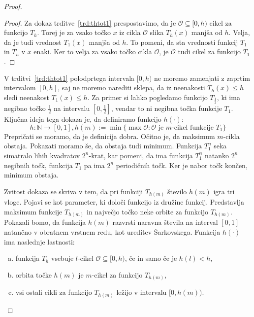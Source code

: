 \documentclass[mat2]{fmfdelo}
\newcommand{\N}{\mathbb N}
\begin{document}
\begin{proof}
\begin{proof}
Za dokaz trditve~\ref{trd:thtot1} prespostavimo, da je $\mathcal{O} \subseteq [0, h)$ cikel za funkcijo $T_h$. Torej je za vsako točko $x$ iz cikla $\mathcal{O}$ slika $T_h(x)$ manjša od $h$. Velja, da je tudi vrednost $T_1(x)$ manjša od $h$. To pomeni, da sta vrednosti funkcij $T_1$ in $T_h$ v $x$ enaki. Ker to velja za vsako točko cikla $\mathcal{O}$, je $\mathcal{O}$ tudi cikel za funkcijo $T_1$.
\end{proof}
V trditvi~\ref{trd:thtot1} polodprtega intervala $[0, h)$ ne moremo zamenjati z zaprtim intervalom $[0, h]$, saj ne moremo narediti sklepa, da iz neenakosti $T_h(x) \leq h$ sledi neenakost $T_1(x) \leq h$. Za primer si lahko pogledamo funkcijo $T_{\frac{1}{2}}$, ki ima negibno točko $\frac{1}{2}$ na intervalu $[0, \frac{1}{2}]$, vendar to ni negibna točka funkcije $T_1$.
Ključna ideja tega dokaza je, da definiramo funkcijo $h(\cdot)$:
$$h: \N \to [0, 1], h(m) := \min\{\max \mathcal{O}: \mathcal{O}\text{ je }m\text{-cikel funkcije }T_1 \}$$
Prepričati se moramo, da je definicija dobra. Očitno je, da maksimum $m$-cikla obstaja. Pokazati moramo še, da obstaja tudi minimum. Funkcija $T_1^n$ seka simatralo lihih kvadratov $2^n$-krat, kar pomeni, da ima funkcija $T_1^n$ natanko $2^n$ negibnih točk, funkcija $T_1$ pa ima $2^n$ periodičnih točk. Ker je nabor točk končen, minimum obstaja.

Zvitost dokaza se skriva v tem, da pri funkciji $T_{h(m)}$ število $h(m)$ igra tri vloge. Pojavi se kot parameter, ki določi funkcijo iz družine funkcij. Predstavlja maksimum funkcije $T_{h(m)}$ in največjo točko neke orbite za funkcijo $T_{h(m)}$. Pokazali bomo, da funkcija $h(m)$ razvrsti naravna števila na interval $[0, 1]$ natančno v obratnem vrstnem redu, kot ureditev Šarkovskega.
Funkcija $h(\cdot)$ ima naslednje lastnosti:
\begin{enumerate}[(a)]
\item funkcija $T_h$  vsebuje $l$-cikel $\mathcal{O}\subseteq [0, h)$, če in samo če je $h(l)<h$,\label{l1}
\item orbita točke $h(m)$ je $m$-cikel za funkcijo $T_{h(m)}$,\label{l2}
\item vsi ostali cikli za funkcijo $T_{h(m)}$ ležijo v intervalu $[0, h(m)).$\label{l3}
\end{enumerate}


\end{proof}
\end{document}
